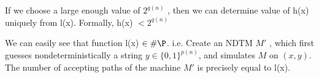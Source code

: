 \documentclass[11pt]{article}
\begin{document}
If we choose a large enough value of $2^{q(n)}$ , then we can determine value of h(x) uniquely from l(x). Formally, 
 h(x) $< 2^{q(n)}$ \newline
 
 We can easily see that function l(x) $\in \#\P$. i.e. Create an NDTM $M'$ , which first guesses nondeterministically a string $y \in \{0,1\}^{p(n)}$,
 and simulates $M$ on $(x,y)$. The number of accepting paths of the machine $M'$ is precisely equal to l(x).


\begin{comment}
\begin{lemma}
\label{lemma1} If $\mathcal{A}\in \parity\P$ then $\exists B$ such
that for any polynomial $q$ and input $x$ of length $n$,
$$x\in \mathcal{A}\Rightarrow (\#(x,y)\in B)\equiv -1 \mod 2^{q(n)}$$
$$x\notin \mathcal{A}\Rightarrow (\#(x,y)\in B)\equiv 0 \mod 2^{q(n)}$$

Now we can state the lemma as, Let $\mathcal{A}\in \parity\P$. Then
for any polynomial $q$, there exists a polynomial-time NTM M such that
for any input $x$ of length $n$,
$$x\in \mathcal{A}\Rightarrow (\chi_M(x))\equiv -1\mod 2^{q(n)}$$
$$x\notin \mathcal{A}\Rightarrow (\chi_M(x))\equiv 0 \mod 2^{q(n)}$$
Here $\chi_M(x)$ denotes the number of accepting computations of $M$
on $x$.
\end{lemma}
\begin{proof} Let $M_1$ be a polynomial time NTM such that
$$\chi_{M_1}\equiv 1\mod 2\mbox{ if } x\in \mathcal{A}$$ %
$$\chi_{M_1}\equiv 0\mod 2 \mbox{ if }x\notin \mathcal{A}$$ 

In other words,
$$x\in \mathcal{A}\Rightarrow (\#acc_M(x)) \mbox{ is odd}$$
$$x\notin \mathcal{A}\Rightarrow (\#acc_M(x))\mbox{ is even}$$


Define another polynomial time NTM $M_2$ that repeats $M_1$ on $x$ a
number of times such that
$$x\in \mathcal{A}\Rightarrow (\#acc_{M_2}(x)) \mbox{ is odd}$$
$$x\notin \mathcal{A}\Rightarrow (\#acc_{M_2}(x))\mbox{ is even}$$

Note: Given two NDTMs $M_1$ and $M_2$, we know how to get an $M_3$
with:
\begin{itemize}
\item $\#acc_{M_3}(x)=\#acc_{M_1}(x)+\#acc_{M_2}(x) $: By running
$M_1$ and $M_2$ in parallel.
\item $\#acc_{M_3}(x)=\#acc_{M_1}(x)\times\#acc_{M_2}(x) $: By rnning
$M_1$ and $M_2$ one after other.
\end{itemize}

Let $f(x,i)=\chi_{M_2}(<x,i>)$. It if clear that $f$ satisfies the
recurrence relation given below:
\begin{eqnarray}
\label{rec} f(x,i+1)=3f(x,i)^4+4f(x,i)^3, i\geq0
\end{eqnarray} From equation ~\ref{rec}
$$f(x,0)\mbox{ is even }\Rightarrow f(x,i)\equiv 0\mod 2^{2^i}$$
$$f(x,0)\mbox{ is odd }\Rightarrow f(x,i)\equiv -1\mod 2^{2^i}$$
Now from the above analysis,
$$x\in \mathcal{A}\Rightarrow (\chi_M(x)\equiv  -1\mod 2^{2^{\log q(n)}}\equiv -1\mod 2^{q(n)}$$
$$x\notin \mathcal{A}\Rightarrow (\chi_M(x)\equiv  0\mod 2^{2^{\log q(n)}}\equiv 0\mod 2^{q(n)}$$
\end{proof}



\end{comment}
\end{document}
